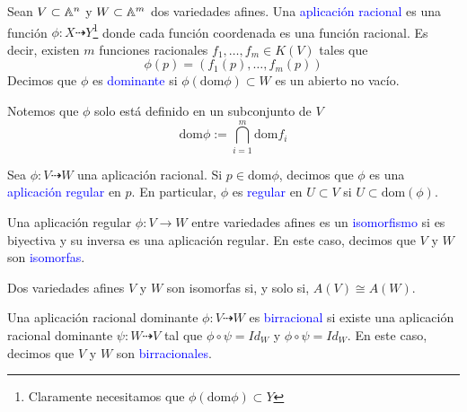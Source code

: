     
    \begin{definition}
        Sean $V\subset\mathbb{A}^n$ y $W\subset\mathbb{A}^m$ dos variedades afines. Una \textcolor{blue}{aplicación racional} es una función $\phi:X\dashrightarrow Y$\footnote{Claramente necesitamos que $\phi(\mathrm{dom}\phi)\subset Y$} donde cada función coordenada es una función racional. Es decir, existen $m$ funciones racionales $f_1,\dots,f_m\in K(V)$ tales que
        \begin{equation*}
            \phi(p)=(f_1(p),\dots, f_m(p))
        \end{equation*}
        Decimos que $\phi$ es \textcolor{blue}{dominante} si $\phi(\mathrm{dom}\phi)\subset W$ es un abierto no vacío.
    \end{definition}

    Notemos que $\phi$ solo está definido en un subconjunto de $V$
        \begin{equation*}
            \mathrm{dom}\phi:=\bigcap_{i=1}^m\mathrm{dom}f_i
        \end{equation*}

    \begin{definition}
        Sea $\phi:V\dashrightarrow W$ una aplicación racional. Si $p\in \mathrm{dom}\phi$, decimos que $\phi$ es una \textcolor{blue}{aplicación regular} en $p$. En particular, $\phi$ es \textcolor{blue}{regular} en $U\subset V$ si $U\subset\mathrm{dom}(\phi)$.
    \end{definition}
        

    \begin{definition}
        Una aplicación regular $\phi:V\to W$ entre variedades afines es un \textcolor{blue}{isomorfismo} si es biyectiva y su inversa es una aplicación regular. En este caso, decimos que $V$ y $W$ son \textcolor{blue}{isomorfas}.
    \end{definition}

    \begin{propo}
        Dos variedades afines $V$ y $W$ son isomorfas si, y solo si, $A(V)\cong A(W)$.
    \end{propo}
    
    \begin{definition}
        Una aplicación racional dominante $\phi:V\dashrightarrow W$ es \textcolor{blue}{birracional} si existe una aplicación racional dominante $\psi:W\dashrightarrow V$ tal que $\phi\circ \psi=Id_W$ y $\phi\circ \psi=Id_W$. En este caso, decimos que $V$ y $W$ son \textcolor{blue}{birracionales}.
    \end{definition}

